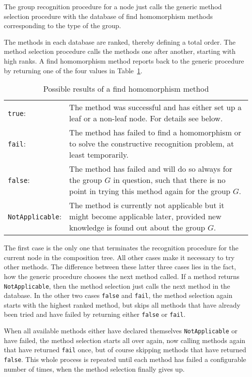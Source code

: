 The group recognition procedure for a node just calls the generic method
selection procedure with the database of find homomorphism methods
corresponding to the type of the group.

The methods in each database are ranked, thereby defining a total
order. The method selection procedure calls the methods one after another,
starting with high ranks. A find homomorphism method reports back to
the generic procedure by returning one of the four values in
Table~\ref{methselresults}.

\begin{table}[ht]
\begin{tabular}{lp{4in}}
\texttt{true}: &
   The method was successful and has either set up a
   leaf or a non-leaf node. For details see below. \\
\texttt{fail}: &
   The method has failed to find a homomorphism or
   to solve the constructive recognition problem, at least temporarily. \\
\texttt{false}: &
   The method has failed and will do so always for
   the group $G$ in question, such that there is no point in trying
   this method again for the group $G$. \\
\texttt{NotApplicable}: &
   The method is currently not applicable
   but it might become applicable later, provided new knowledge is
   found out about the group $G$.
\end{tabular}
\caption{Possible results of a find homomorphism method}
\label{methselresults}
\end{table}

The first case is the only one that terminates the recognition procedure
for the current node in the composition tree.
All other cases make it necessary to try other methods. The difference
between these latter three cases lies in the fact, how the generic
procedure chooses the next method called. If a method returns
\texttt{NotApplicable}, then the method selection just calls the next
method in the database. In the other two cases \texttt{false} and 
\texttt{fail}, the method selection again starts with the highest ranked
method, but skips all methods that have already been tried and
have failed by returning either \texttt{false} or \texttt{fail}.

When all available methods either have declared themselves
\texttt{NotApplicable} or have failed, the method selection 
starts all over again, now calling methods again that have returned
\texttt{fail} once, but of course skipping methods that have returned
\texttt{false}. This whole process is repeated until each method has
failed a configurable number of times, when the method selection
finally gives up.

